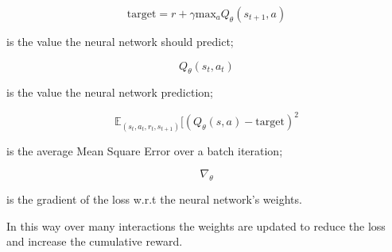 \documentclass[14pt]{extarticle}
\begin{document}
\begin{flushleft}
\begin{equation} \label{eq:target}
\text{target} = r + \gamma\text{max}_{a}Q_{\theta}(s_{t+1},a)
\end{equation}
\vspace{-10mm}
\begin{center}
is the value the neural network should predict;
\end{center}

\[Q_{\theta}(s_t,a_t)\]
\vspace{-10mm}
\begin{center}
is the value the neural network prediction;
\end{center}

\[\mathbb{E}_{(s_t,a_t,r_t,s_{t+1})}[(Q_{\theta}(s,a) - \text{target})^2\] 
\vspace{-10mm}
\begin{center}
is the average Mean Square Error over a batch iteration;
\end{center}

\[\nabla_{\theta}\]
\vspace{-10mm}
\begin{center}
is the gradient of the loss w.r.t the neural network's weights.
\end{center}

In this way over many interactions the weights are updated to reduce the loss and increase the cumulative reward. 
\end{flushleft}
\end{document}
